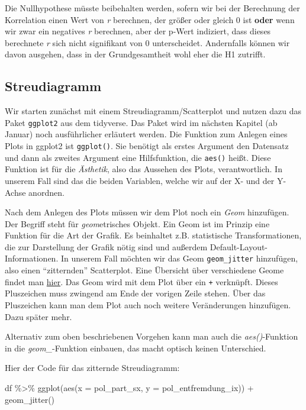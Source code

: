 \documentclass[
]{book}
\newenvironment{Shaded}{\begin{snugshade}}{\end{snugshade}}
\newcommand{\AttributeTok}[1]{\textcolor[rgb]{0.77,0.63,0.00}{#1}}
\newcommand{\FunctionTok}[1]{\textcolor[rgb]{0.00,0.00,0.00}{#1}}
\newcommand{\NormalTok}[1]{#1}
\newcommand{\SpecialCharTok}[1]{\textcolor[rgb]{0.00,0.00,0.00}{#1}}
\begin{document}
Die Nullhypothese müsste beibehalten werden, sofern wir bei der Berechnung der Korrelation einen Wert von \emph{r} berechnen, der größer oder gleich 0 ist \textbf{oder} wenn wir zwar ein negatives \emph{r} berechnen, aber der p-Wert indiziert, dass dieses berechnete \emph{r} sich nicht signifikant von 0 unterscheidet. Andernfalls können wir davon ausgehen, dass in der Grundgesamtheit wohl eher die H1 zutrifft.

\hypertarget{streudiagramm}{%
\subsection{Streudiagramm}\label{streudiagramm}}

Wir starten zunächst mit einem Streudiagramm/Scatterplot und nutzen dazu das Paket \texttt{ggplot2} aus dem tidyverse. Das Paket wird im nächsten Kapitel (ab Januar) noch ausführlicher erläutert werden. Die Funktion zum Anlegen eines Plots in ggplot2 ist \texttt{ggplot()}. Sie benötigt als erstes Argument den Datensatz und dann als zweites Argument eine Hilfsfunktion, die \texttt{aes()} heißt. Diese Funktion ist für die \emph{Ästhetik}, also das Aussehen des Plots, verantwortlich. In unserem Fall sind das die beiden Variablen, welche wir auf der X- und der Y-Achse anordnen.

Nach dem Anlegen des Plots müssen wir dem Plot noch ein \emph{Geom} hinzufügen. Der Begriff steht für \emph{geom}etrisches Objekt. Ein Geom ist im Prinzip eine Funktion für die Art der Grafik. Es beinhaltet z.B. statistische Transformationen, die zur Darstellung der Grafik nötig sind und außerdem Default-Layout-Informationen. In unserem Fall möchten wir das Geom \texttt{geom\_jitter} hinzufügen, also einen ``zitternden'' Scatterplot. Eine Übersicht über verschiedene Geome findet man \href{https://rstudio.com/wp-content/uploads/2015/06/ggplot2-german.pdf}{hier}. Das Geom wird mit dem Plot über ein \texttt{+} verknüpft. Dieses Pluszeichen muss zwingend am Ende der vorigen Zeile stehen. Über das Pluszeichen kann man dem Plot auch noch weitere Veränderungen hinzufügen. Dazu später mehr.

Alternativ zum oben beschriebenen Vorgehen kann man auch die \emph{aes()}-Funktion in die \emph{geom\_}-Funktion einbauen, das macht optisch keinen Unterschied.

Hier der Code für das zitternde Streudiagramm:

\begin{Shaded}
\begin{Highlighting}[]
\NormalTok{df }\SpecialCharTok{\%\textgreater{}\%} 
  \FunctionTok{ggplot}\NormalTok{(}\FunctionTok{aes}\NormalTok{(}\AttributeTok{x =}\NormalTok{ pol\_part\_sx, }\AttributeTok{y =}\NormalTok{ pol\_entfremdung\_ix)) }\SpecialCharTok{+}
  \FunctionTok{geom\_jitter}\NormalTok{() }
\end{Highlighting}
\end{Shaded}
\end{document}
